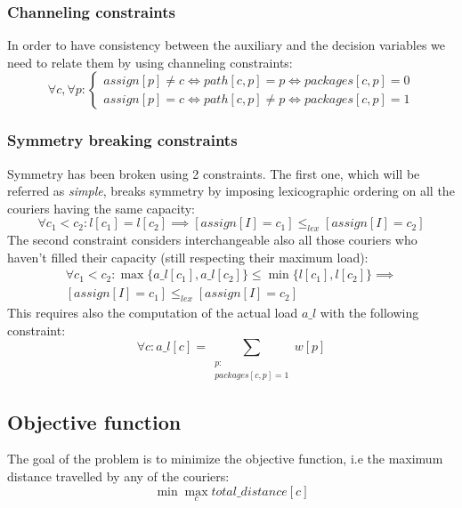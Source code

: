 \subsubsection{Channeling constraints}
In order to have consistency between the auxiliary and the decision variables we need to relate them by using channeling constraints:
\begin{equation}
    \forall c, \forall p :
    \begin{cases}
    assign[p] \neq c \iff path[c, p] = p \iff packages[c,p] = 0  \\
    assign[p] = c \iff path[c, p] \neq p \iff packages[c,p] = 1
    \end{cases}
\end{equation}
\subsubsection{Symmetry breaking constraints}
Symmetry has been broken using 2 constraints. The first one, which will be referred as \textit{simple}, breaks symmetry by imposing lexicographic ordering on all the couriers having the same capacity:
\begin{equation}
\label{eq:sym1}
    \forall c_1<c_2 : l[c_1] = l[c_2] \implies 
    [assign[I] = c_1] \leq_{lex} [assign[I] = c_2]
\end{equation}
The second constraint considers interchangeable also all those couriers who haven't filled their capacity (still respecting their maximum load):
\begin{equation}
\label{eq:sym2}
    \begin{split}
    \forall c_1<c_2 : \max\{ a\_l[c_1], a\_l[c_2] \} \leq \min\{ l[c_1], l[c_2] \} \implies \\
    [assign[I] = c_1] \leq_{lex} [assign[I] = c_2]
    \end{split}
\end{equation}
This requires also the computation of the actual load $a\_l$ with the following constraint:
\begin{equation}
    \forall c : a\_l[c] = \sum_{\substack{p:\\ packages[c,p] = 1}} w[p]
\end{equation}

\subsection{Objective function}
The goal of the problem is to minimize the objective function, i.e the maximum distance travelled by any of the couriers:
\begin{equation}
     \min \max_{c} total\_distance[c]
\end{equation}



